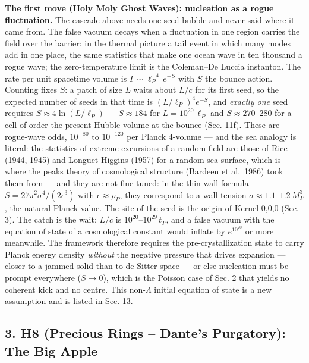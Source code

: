 \documentclass[
  11pt,
]{article}
\begin{document}
\textbf{The first move (Holy Moly Ghost Waves): nucleation as a rogue
fluctuation.} The cascade above needs one seed bubble and never said
where it came from. The false vacuum decays when a fluctuation in one
region carries the field over the barrier: in the thermal picture a tail
event in which many modes add in one place, the same statistics that
make one ocean wave in ten thousand a rogue wave; the zero-temperature
limit is the Coleman--De Luccia instanton. The rate per unit spacetime
volume is \(\Gamma \sim \ell_P^{-4}\,e^{-S}\) with \(S\) the bounce
action. Counting fixes \(S\): a patch of size \(L\) waits about \(L/c\)
for its first seed, so the expected number of seeds in that time is
\((L/\ell_P)^4 e^{-S}\), and \emph{exactly one} seed requires
\(S \approx 4\ln(L/\ell_P)\) --- \(S \approx 184\) for
\(L = 10^{20}\,\ell_P\) and \(S \approx 270\)--\(280\) for a cell of
order the present Hubble volume at the bounce (Sec. 11f). These are
rogue-wave odds, \(10^{-80}\) to \(10^{-120}\) per Planck 4-volume ---
and the sea analogy is literal: the statistics of extreme excursions of
a random field are those of Rice (1944, 1945) and Longuet-Higgins (1957)
for a random sea surface, which is where the peaks theory of
cosmological structure (Bardeen et al.~1986) took them from --- and they
are not fine-tuned: in the thin-wall formula
\(S = 27\pi^2\sigma^4/(2\epsilon^3)\) with \(\epsilon \approx \rho_P\),
they correspond to a wall tension
\(\sigma \approx 1.1\)--\(1.2\,M_P^3\), the natural Planck value. The
site of the seed is the origin of Kernel 0,0,0 (Sec. 3). The catch is
the wait: \(L/c\) is \(10^{20}\)--\(10^{29}\,t_P\), and a false vacuum
with the equation of state of a cosmological constant would inflate by
\(e^{10^{20}}\) or more meanwhile. The framework therefore requires the
pre-crystallization state to carry Planck energy density \emph{without}
the negative pressure that drives expansion --- closer to a jammed solid
than to de Sitter space --- or else nucleation must be prompt everywhere
(\(S \to 0\)), which is the Poisson case of Sec. 2 that yields no
coherent kick and no centre. This non-\(\Lambda\) initial equation of
state is a new assumption and is listed in Sec. 13.

\hypertarget{h8-precious-rings-dantes-purgatory-the-big-apple}{%
\subsection{\texorpdfstring{\textbf{3. H8 (Precious Rings -- Dante's
Purgatory): The Big
Apple}}{3. H8 (Precious Rings -- Dante's Purgatory): The Big Apple}}\label{h8-precious-rings-dantes-purgatory-the-big-apple}}
\end{document}
